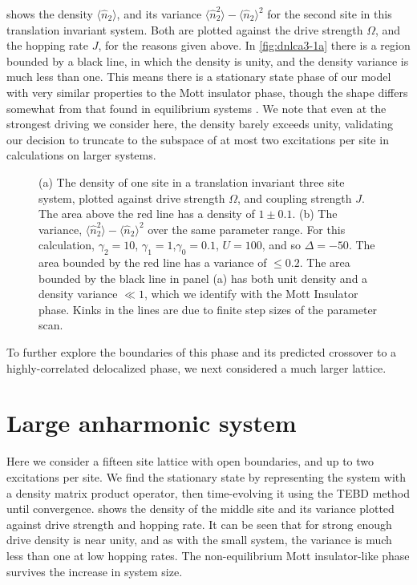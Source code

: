  shows the density \(\langle \hat{n}_{2} \rangle\), and its variance \(\langle \hat{n}_{2}^{2} \rangle - \langle \hat{n}_{2} \rangle^{2}\) for the second site in this translation invariant system. Both are plotted against the drive strength \(\Omega\), and the hopping rate \(J\), for the reasons given above. In \cref{fig:dnlca3-1a} there is a region bounded by a black line, in which the density is unity, and the density variance is much less than one. This means there is a stationary state phase of our model with very similar properties to the Mott insulator phase, though the shape differs somewhat from that found in equilibrium systems \cite{Rossini2007}. We note that even at the strongest driving we consider here, the density barely exceeds unity, validating our decision to truncate to the subspace of at most two excitations per site in calculations on larger systems.

\begin{figure}[ht]
	 \hfill
	\caption{\label{fig:dnlca3-1} (a) The density of one site in a translation invariant three site system, plotted against drive strength \(\Omega\), and coupling strength \(J\). The area above the red line has a density of \(1 \pm 0.1\). (b) The variance, \(\langle \hat{n}_{2}^{2} \rangle - \langle \hat{n}_{2} \rangle^{2}\) over the same parameter range. For this calculation, \(\gamma_{2} = 10\), \(\gamma_{1} = 1\),\(\gamma_{0} = 0.1\), \(U=100\), and so \(\Delta = -50\). The area bounded by the red line has a variance of \(\leq 0.2\). The area bounded by the black line in panel (a) has both unit density and a density variance \(\ll 1\), which we identify with the Mott Insulator phase. Kinks in the lines are due to finite step sizes of the parameter scan.}
\end{figure}

To further explore the boundaries of this phase and its predicted crossover to a highly-correlated delocalized phase, we next considered a much larger lattice.

\section{Large anharmonic system}

Here we consider a fifteen site lattice with open boundaries, and up to two excitations per site. We find the stationary state by representing the system with a density matrix product operator, then time-evolving it using the TEBD method \cite{Vidal2004} until convergence.  shows the density of the middle site and its variance plotted against drive strength and hopping rate. It can be seen that for strong enough drive density is near unity, and as with the small system, the variance is much less than one at low hopping rates. The non-equilibrium Mott insulator-like phase survives the increase in system size.

